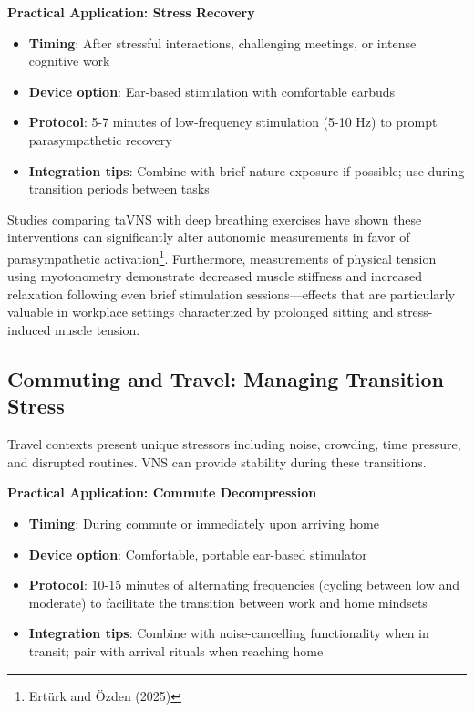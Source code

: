 \documentclass[
  Letterpaper,
]{scrbook}
\providecommand{\tightlist}{%
  \setlength{\itemsep}{0pt}\setlength{\parskip}{0pt}}\usepackage{longtable,booktabs,array}
\begin{document}
\textbf{Practical Application: Stress Recovery}

\begin{itemize}
\tightlist
\item
  \textbf{Timing}: After stressful interactions, challenging meetings,
  or intense cognitive work
\item
  \textbf{Device option}: Ear-based stimulation with comfortable earbuds
\item
  \textbf{Protocol}: 5-7 minutes of low-frequency stimulation (5-10 Hz)
  to prompt parasympathetic recovery
\item
  \textbf{Integration tips}: Combine with brief nature exposure if
  possible; use during transition periods between tasks
\end{itemize}

Studies comparing taVNS with deep breathing exercises have shown these
interventions can significantly alter autonomic measurements in favor of
parasympathetic activation\footnote{Ertürk and Özden (2025)}.
Furthermore, measurements of physical tension using myotonometry
demonstrate decreased muscle stiffness and increased relaxation
following even brief stimulation sessions---effects that are
particularly valuable in workplace settings characterized by prolonged
sitting and stress-induced muscle tension.

\subsection{Commuting and Travel: Managing Transition
Stress}\label{commuting-and-travel-managing-transition-stress}

Travel contexts present unique stressors including noise, crowding, time
pressure, and disrupted routines. VNS can provide stability during these
transitions.

\textbf{Practical Application: Commute Decompression}

\begin{itemize}
\tightlist
\item
  \textbf{Timing}: During commute or immediately upon arriving home
\item
  \textbf{Device option}: Comfortable, portable ear-based stimulator
\item
  \textbf{Protocol}: 10-15 minutes of alternating frequencies (cycling
  between low and moderate) to facilitate the transition between work
  and home mindsets
\item
  \textbf{Integration tips}: Combine with noise-cancelling functionality
  when in transit; pair with arrival rituals when reaching home
\end{itemize}
\end{document}
